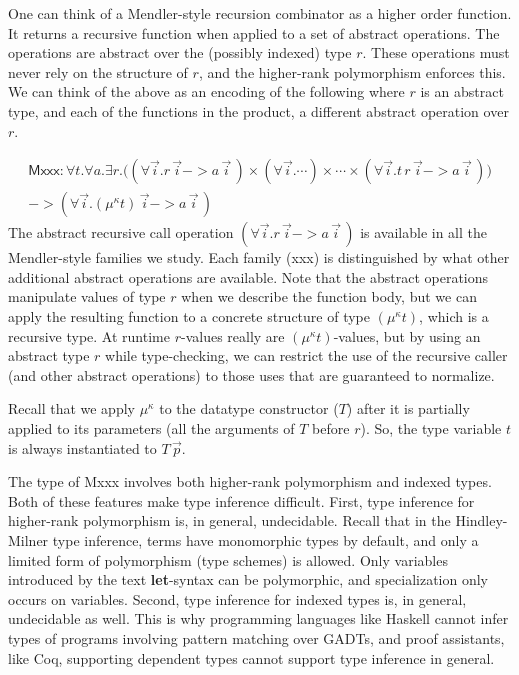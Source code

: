 One can think of a Mendler-style recursion combinator as a higher order function.
It returns a recursive function when applied to a set of abstract operations. The
operations are abstract over the (possibly indexed) type $r$. These operations must
never rely on the structure of $r$, and the higher-rank polymorphism enforces this.
We can think of the above as an encoding of the following where $r$ is an abstract
type, and each of the functions in the product, a different abstract operation over $r$.

\begin{multline*}
 \textsf{Mxxx} : \forall t . \forall a .
 \exists r.
  \big(  (\forall\vec{i} . r\,\vec{i} -> a\,\vec{i}\,)
   \times (\forall\vec{i} . \cdots) \times \cdots
   \times (\forall\vec{i} . t\, r\,\vec{i} -> a\,\vec{i}\,)
   \big) \\
 -> (\forall\vec{i} . (\mu^\kappa t)\,\vec{i} -> a\,\vec{i}\,)
\end{multline*}
The abstract recursive call operation $(\forall\vec{i} . r\,\vec{i} -> a\,\vec{i}\,)$ is available in
all the Mendler-style families we study. Each family (\textsf{xxx})
is distinguished by what other additional abstract operations are available.
Note that the abstract operations manipulate values of type $r$ when we describe
the function body, but we can apply the resulting function
to a concrete structure of type $(\mu^\kappa t)$, which is a recursive type.
At runtime $r$-values really are $(\mu^\kappa t)$-values, but
by using an abstract type $r$ while type-checking, we
can restrict the use of the recursive caller (and other abstract operations) to those uses that are guaranteed to normalize. 

Recall that we apply $\mu^\kappa$ to the datatype constructor ($T$) after it is
partially applied to its parameters (all the arguments of $T$ before $r$). So,
the type variable $t$ is always instantiated to $T\,\vec{p}$.

The type of \textsf{Mxxx} involves both higher-rank polymorphism and
indexed types. Both of these features make type inference difficult.
First, type inference for higher-rank polymorphism is, in general, undecidable.
Recall that in the Hindley-Milner type inference, terms have monomorphic types
by default, and only a limited form of polymorphism (type schemes) is allowed.
Only variables introduced by the text {\bf let}-syntax can be
polymorphic, and specialization only occurs on variables. 
Second, type inference for indexed types is, in general, undecidable as well.
This is why programming languages like Haskell cannot infer types of programs
involving pattern matching over GADTs, and proof assistants, like Coq,
supporting dependent types cannot support type inference in general. 

